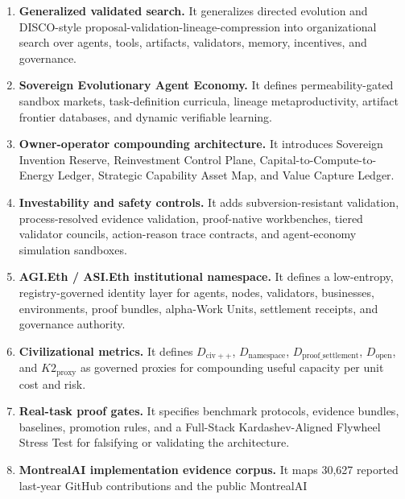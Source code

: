 \documentclass[
  11pt,
]{article}
\begin{document}
\begin{enumerate}
  \textbf{Proof-gated AI-generating work engine.} It generalizes AI-GAs,
  OMNI-EPIC-style open-ended task generation, ADAS-style agent design,
  and Absolute Zero-style verifier-grounded self-play into a
  commercially independent layer that generates tasks, environments,
  agents, validators, proof templates, curricula, and capability
  packages under proof, replay, safety, settlement, AGI.Eth namespace
  authority, and civilizational value-to-energy constraints.
\item
  \textbf{Generalized validated search.} It generalizes directed
  evolution and DISCO-style proposal-validation-lineage-compression into
  organizational search over agents, tools, artifacts, validators,
  memory, incentives, and governance.
\item
  \textbf{Sovereign Evolutionary Agent Economy.} It defines
  permeability-gated sandbox markets, task-definition curricula, lineage
  metaproductivity, artifact frontier databases, and dynamic verifiable
  learning.
\item
  \textbf{Owner-operator compounding architecture.} It introduces
  Sovereign Invention Reserve, Reinvestment Control Plane,
  Capital-to-Compute-to-Energy Ledger, Strategic Capability Asset Map,
  and Value Capture Ledger.
\item
  \textbf{Investability and safety controls.} It adds
  subversion-resistant validation, process-resolved evidence validation,
  proof-native workbenches, tiered validator councils, action-reason
  trace contracts, and agent-economy simulation sandboxes.
\item
  \textbf{AGI.Eth / ASI.Eth institutional namespace.} It defines a
  low-entropy, registry-governed identity layer for agents, nodes,
  validators, businesses, environments, proof bundles, alpha-Work Units,
  settlement receipts, and governance authority.
\item
  \textbf{Civilizational metrics.} It defines \(D_{\mathrm{civ}++}\),
  \(D_{\mathrm{namespace}}\), \(D_{\mathrm{proof\_settlement}}\),
  \(D_{\mathrm{open}}\), and \(K2_{\mathrm{proxy}}\) as governed proxies
  for compounding useful capacity per unit cost and risk.
\item
  \textbf{Real-task proof gates.} It specifies benchmark protocols,
  evidence bundles, baselines, promotion rules, and a Full-Stack
  Kardashev-Aligned Flywheel Stress Test for falsifying or validating
  the architecture.
\item
  \textbf{MontrealAI implementation evidence corpus.} It maps 30,627
  reported last-year GitHub contributions and the public MontrealAI

\end{enumerate}
\end{document}
